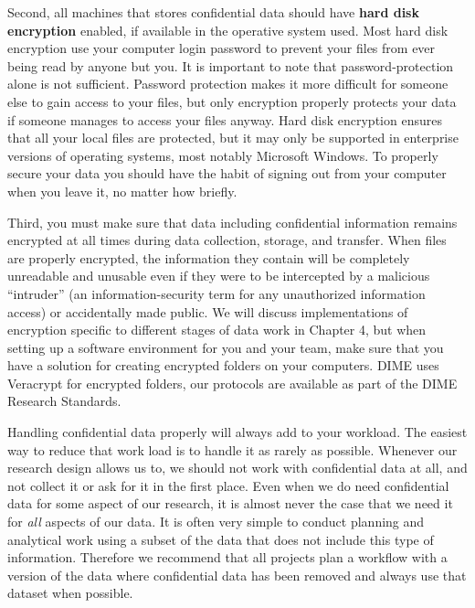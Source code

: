 Second, all machines that stores confidential data
should have \textbf{hard disk encryption} enabled,
if available in the operative system used.
Most hard disk encryption use your computer login password to
prevent your files from ever being read by anyone but you.
It is important to note that password-protection alone is not sufficient.
Password protection makes it more difficult for someone else to gain access to your files,
but only encryption properly protects your data if someone manages to access your files anyway.
Hard disk encryption ensures that all your local files are protected,
but it may only be supported in enterprise versions of operating systems,
most notably Microsoft Windows.
To properly secure your data you should have the habit of
signing out from your computer when you leave it,
no matter how briefly.

Third, you must make sure that data including confidential information
remains encrypted at all times during data collection, storage, and transfer.
When files are properly encrypted,
the information they contain will be completely unreadable and unusable
even if they were to be intercepted by a malicious ``intruder''
(an information-security term for any unauthorized information access)
or accidentally made public.
We will discuss implementations of encryption
specific to different stages of data work in Chapter 4,
but when setting up a software environment for you and your team,
make sure that you have a solution for creating encrypted folders on your computers.
DIME uses Veracrypt for encrypted folders,
our protocols are available as part of the DIME Research Standards.

Handling confidential data properly will always add to your workload.
The easiest way to reduce that work load is to
handle it as rarely as possible.
Whenever our research design allows us to,
we should not work with confidential data at all,
and not collect it or ask for it in the first place.
Even when we do need confidential data for some aspect of our research,
it is almost never the case that we need it for \textit{all} aspects of our data.
It is often very simple to conduct planning and analytical work
using a subset of the data that does not include this type of information.
Therefore we recommend that all projects plan a workflow
with a version of the data where confidential data has been removed
and always use that dataset when possible.


